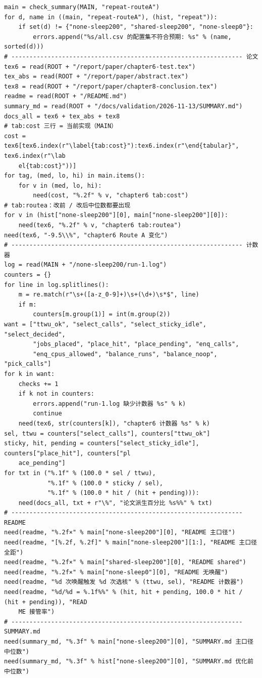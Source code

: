 \documentclass[10pt,a4paper]{article}
\newenvironment{yatpage}{\vspace*{0pt}}{\par}
\begin{document}
\begin{yatpage}
\begin{Verbatim}[fontsize=\fontsize{8.2}{9.8}\selectfont]
main = check_summary(MAIN, "repeat-routeA")
for d, name in ((main, "repeat-routeA"), (hist, "repeat")):
    if set(d) != {"none-sleep200", "shared-sleep200", "none-sleep0"}:
        errors.append("%s/all.csv 的配置集不符合预期: %s" % (name, sorted(d)))
# ---------------------------------------------------------------- 论文
tex6 = read(ROOT + "/report/paper/chapter6-test.tex")
tex_abs = read(ROOT + "/report/paper/abstract.tex")
tex8 = read(ROOT + "/report/paper/chapter8-conclusion.tex")
readme = read(ROOT + "/README.md")
summary_md = read(ROOT + "/docs/validation/2026-11-13/SUMMARY.md")
docs_all = tex6 + tex_abs + tex8
# tab:cost 三行 = 当前实现（MAIN）
cost = tex6[tex6.index(r"\label{tab:cost}"):tex6.index(r"\end{tabular}", tex6.index(r"\lab
    el{tab:cost}"))]
for tag, (med, lo, hi) in main.items():
    for v in (med, lo, hi):
        need(cost, "%.2f" % v, "chapter6 tab:cost")
# tab:routea：改前 / 改后中位数都要出现
for v in (hist["none-sleep200"][0], main["none-sleep200"][0]):
    need(tex6, "%.2f" % v, "chapter6 tab:routea")
need(tex6, "-9.5\\%", "chapter6 Route A 变化")
# ---------------------------------------------------------------- 计数器
log = read(MAIN + "/none-sleep200/run-1.log")
counters = {}
for line in log.splitlines():
    m = re.match(r"\s+([a-z_0-9]+)\s+(\d+)\s*$", line)
    if m:
        counters[m.group(1)] = int(m.group(2))
want = ["ttwu_ok", "select_calls", "select_sticky_idle", "select_decided",
        "jobs_placed", "place_hit", "place_pending", "enq_calls",
        "enq_cpus_allowed", "balance_runs", "balance_noop", "pick_calls"]
for k in want:
    checks += 1
    if k not in counters:
        errors.append("run-1.log 缺少计数器 %s" % k)
        continue
    need(tex6, str(counters[k]), "chapter6 计数器 %s" % k)
sel, ttwu = counters["select_calls"], counters["ttwu_ok"]
sticky, hit, pending = counters["select_sticky_idle"], counters["place_hit"], counters["pl
    ace_pending"]
for txt in ("%.1f" % (100.0 * sel / ttwu),
            "%.1f" % (100.0 * sticky / sel),
            "%.1f" % (100.0 * hit / (hit + pending))):
    need(docs_all, txt + r"\%", "论文派生百分比 %s%%" % txt)
# ---------------------------------------------------------------- README
need(readme, "%.2f×" % main["none-sleep200"][0], "README 主口径")
need(readme, "[%.2f, %.2f]" % main["none-sleep200"][1:], "README 主口径全距")
need(readme, "%.2f×" % main["shared-sleep200"][0], "README shared")
need(readme, "%.2f×" % main["none-sleep0"][0], "README 无唤醒")
need(readme, "%d 次唤醒触发 %d 次选核" % (ttwu, sel), "README 计数器")
need(readme, "%d/%d = %.1f%%" % (hit, hit + pending, 100.0 * hit / (hit + pending)), "READ
    ME 接管率")
# ---------------------------------------------------------------- SUMMARY.md
need(summary_md, "%.3f" % main["none-sleep200"][0], "SUMMARY.md 主口径中位数")
need(summary_md, "%.3f" % hist["none-sleep200"][0], "SUMMARY.md 优化前中位数")
\end{Verbatim}
\end{yatpage}
\end{document}
